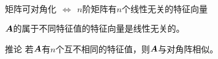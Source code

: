         \begin{frame}



          
          \begin{dingli}
            $\mbox{矩阵可对角化} ~~\Longleftrightarrow~~
            \mbox{$n$阶矩阵有$n$个线性无关的特征向量}$ 
          \end{dingli}
          
          \begin{dingli}
            $\boldsymbol{A}$的属于不同特征值的特征向量是线性无关的。
          \end{dingli}
          
          \begin{tuilun}{推论}
            若$\boldsymbol{A}$有$n$个互不相同的特征值，则$\boldsymbol{A}$与对角阵相似。
          \end{tuilun}
          
        \end{frame}


